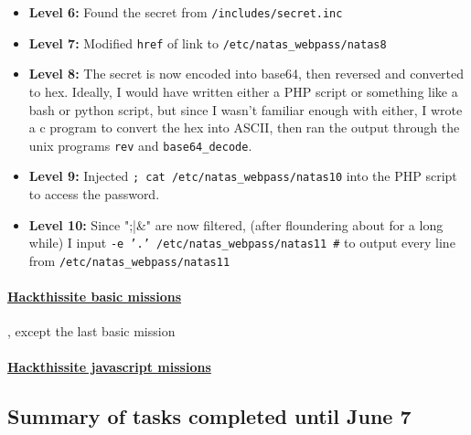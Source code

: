 \documentclass{article}
\def\code#1{\texttt{#1}}
\begin{document}
\begin{itemize}
\begin{itemize}
            \item \textbf{Level 6: } Found the secret from \code{/includes/secret.inc}

            \item \textbf{Level 7: } Modified \code{href} of link to \code{/etc/natas\_webpass/natas8}

            \item \textbf{Level 8: } The secret is now encoded into base64, then reversed and converted to hex. Ideally, I would have written either a PHP script or something like a bash or python script, but since I wasn't familiar enough with either, I wrote a c program to convert the hex into ASCII, then ran the output through the unix programs \code{rev} and \code{base64\_decode}.

            \item \textbf{Level 9: } Injected \code{; cat /etc/natas\_webpass/natas10} into the PHP script to access the password.

            \item \textbf{Level 10: } Since ";|\&" are now filtered, (after floundering about for a long while) I input \code{-e '.' /etc/natas\_webpass/natas11 \#} to output every line from \code{/etc/natas\_webpass/natas11}

        \end{itemize}

        \paragraph{\href{http://hackthissite.org/missions/basic}{Hackthissite basic missions}}, except the last basic mission

        \paragraph{\href{http://hackthissite.org/missions/javascript}{Hackthissite javascript missions}}

        \subsection*{Summary of tasks completed until June 7}


\end{itemize}
\end{document}
